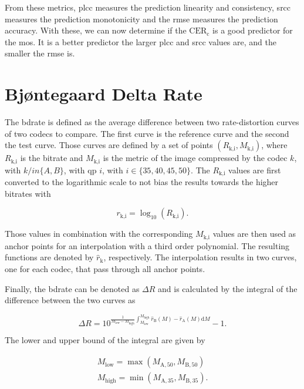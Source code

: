 From these metrics, \gls{plcc} measures the prediction linearity and consistency, \gls{srcc} measures the prediction monotonicity and the \gls{rmse} measures the prediction accuracy.
With these, we can now determine if the $\text{CER}_{\text{c}}$ is a good predictor for the \gls{mos}.
It is a better predictor the larger \gls{plcc} and \gls{srcc} values are, and the smaller the \gls{rmse} is.


\section{Bjøntegaard Delta Rate}
\label{subsec:bdrate}

The \gls{bdrate} \cite{bdrate_original_2001}\cite{bdrate_beyond_2022} is defined as the average difference between two rate-distortion curves of two codecs to compare.
The first curve is the reference curve and the second the test curve.
Those curves are defined by a set of points $(R_{\text{k,i}}, M_{\text{k,i}})$, where $R_{\text{k,i}}$ is the bitrate and $M_{\text{k,i}}$ is the metric of the image compressed by the codec $k$, with $k /in \{A,B\}$, with \gls{qp} $i$, with $i \in \{35,40,45,50\}$.
The $R_{\text{k,i}}$ values are first converted to the logarithmic scale to not bias the results towards the higher bitrates with

\begin{equation}
    r_{\text{k,i}} = \log_{10}\left(R_{\text{k,i}}\right).
    \label{eq:log_scale}
\end{equation}

Those values in combination with the corresponding $M_{\text{k,i}}$ values are then used as anchor points for an interpolation with a third order polynomial.
The resulting functions are denoted by $\hat{r}_{\text{k}}$, respectively.
The interpolation results in two curves, one for each codec, that pass through all anchor points.

Finally, the \gls{bdrate} can be denoted as $\Delta R$ and is calculated by the integral of the difference between the two curves as

\begin{equation}
    \Delta R = 10^{\frac{1}{M_{\text{low}}-M_{\text{high}}} \int_{M_{\text{low}}}^{M_{\text{high}}} \hat{r}_{\text{B}}(M) - \hat{r}_{\text{A}}(M) \text{d}M} - 1.
    \label{eq:bdrate}
\end{equation}

The lower and upper bound of the integral are given by

\begin{equation}
    \begin{aligned}
        M_{\text{low}} = \max\left(M_{\text{A},50}, M_{\text{B},50}\right) \\
        M_{\text{high}} = \min\left(M_{\text{A},35}, M_{\text{B},35}\right).
    \end{aligned}
    \label{eq:bounds}
\end{equation}

